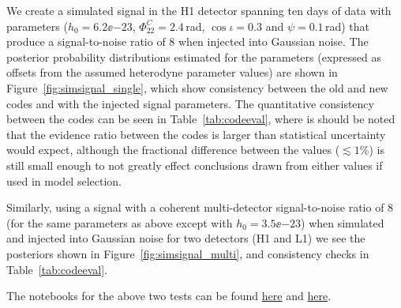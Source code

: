 We create a simulated signal in the H1 detector spanning ten days of data with parameters ($h_0 = 6.2\ee{-23}$, $\Phi_{22}^C = 2.4$\,rad, $\cos{\iota} = 0.3$
and $\psi = 0.1$\,rad) that produce a signal-to-noise ratio of 8 when injected into
Gaussian noise. The posterior probability distributions estimated for the parameters (expressed as offsets from the assumed heterodyne parameter values) are
shown in Figure~\ref{fig:simsignal_single}, which show consistency
between the old and new codes and with the injected signal parameters. The quantitative consistency between the codes can be seen in Table~\ref{tab:codeeval},
where is should be noted that the evidence ratio between the codes is larger than statistical uncertainty would expect, although the fractional difference between
the values ($\lesssim 1\%$) is still small enough to not greatly effect conclusions drawn from either values if used in model selection.

Similarly, using a signal with a coherent multi-detector signal-to-noise ratio of 8 (for the same parameters as above except with $h_0 = 3.5\ee{-23}$) when
simulated and injected into Gaussian noise for two detectors (H1
and L1) we see the posteriors shown in Figure~\ref{fig:simsignal_multi}, and consistency checks in Table~\ref{tab:codeeval}.

The notebooks for the above two tests can be found \href{https://github.com/mattpitkin/CW_nested_sampling_doc/blob/master/figures/codeeval/simulations/signal/SimulatedSignalTestsPaper.ipynb}{here} and 
\href{https://github.com/mattpitkin/CW_nested_sampling_doc/blob/master/figures/codeeval/simulations/signal_multidet/SimulatedSignalMultidetTestsPaper.ipynb}{here}.

